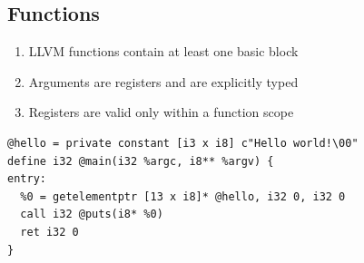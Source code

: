 \documentclass[a4paper]{exam}
\theoremstyle{definition}
\begin{document}
\subsection{Functions}
\begin{enumerate}
  \item LLVM functions contain at least one basic block
  \item Arguments are registers and are explicitly typed
  \item Registers are valid only within a function scope
\end{enumerate}
\begin{verbatim}
@hello = private constant [i3 x i8] c"Hello world!\00"
define i32 @main(i32 %argc, i8** %argv) {
entry:
  %0 = getelementptr [13 x i8]* @hello, i32 0, i32 0
  call i32 @puts(i8* %0)
  ret i32 0  
}
\end{verbatim}
\end{document}
